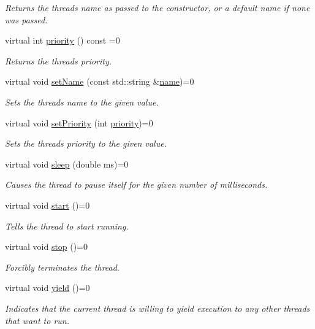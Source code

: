 \begin{DoxyCompactItemize}
\begin{DoxyCompactList}\small\item\em Returns the thread\textquotesingle{}s name as passed to the constructor, or a default name if none was passed. \end{DoxyCompactList}\item 
virtual int \mbox{\hyperlink{classsgl_1_1GThread_afefd48fe4270e6c5f2ec4c129080bfde}{priority}} () const =0
\begin{DoxyCompactList}\small\item\em Returns the thread\textquotesingle{}s priority. \end{DoxyCompactList}\item 
virtual void \mbox{\hyperlink{classsgl_1_1GThread_aa384b56425e77d3a0ea434eed3f37b53}{set\+Name}} (const std\+::string \&\mbox{\hyperlink{classsgl_1_1GThread_a7f04e718c6856c4d3d77a496b6acad0d}{name}})=0
\begin{DoxyCompactList}\small\item\em Sets the thread\textquotesingle{}s name to the given value. \end{DoxyCompactList}\item 
virtual void \mbox{\hyperlink{classsgl_1_1GThread_aa64e7a844400aed800a4f223da0d03d8}{set\+Priority}} (int \mbox{\hyperlink{classsgl_1_1GThread_afefd48fe4270e6c5f2ec4c129080bfde}{priority}})=0
\begin{DoxyCompactList}\small\item\em Sets the thread\textquotesingle{}s priority to the given value. \end{DoxyCompactList}\item 
virtual void \mbox{\hyperlink{classsgl_1_1GThread_aa766a832061596446daffb891f42b71d}{sleep}} (double ms)=0
\begin{DoxyCompactList}\small\item\em Causes the thread to pause itself for the given number of milliseconds. \end{DoxyCompactList}\item 
virtual void \mbox{\hyperlink{classsgl_1_1GThread_ac0ae5f26cd2001d772aed9d2ea97d41c}{start}} ()=0
\begin{DoxyCompactList}\small\item\em Tells the thread to start running. \end{DoxyCompactList}\item 
virtual void \mbox{\hyperlink{classsgl_1_1GThread_a0efff8623a2fb79dad94a96dcf16d966}{stop}} ()=0
\begin{DoxyCompactList}\small\item\em Forcibly terminates the thread. \end{DoxyCompactList}\item 
virtual void \mbox{\hyperlink{classsgl_1_1GThread_a77a5c1943920f355bd1db8cb99bddcfc}{yield}} ()=0
\begin{DoxyCompactList}\small\item\em Indicates that the current thread is willing to yield execution to any other threads that want to run. \end{DoxyCompactList}\end{DoxyCompactItemize}
